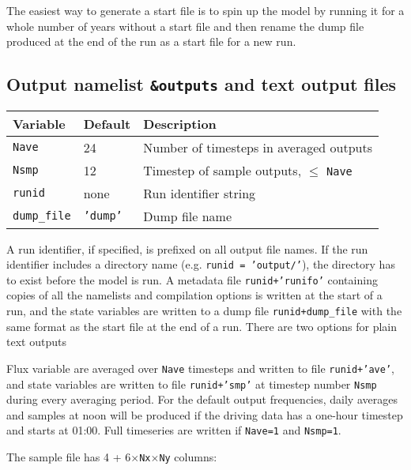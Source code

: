 \documentclass{article}
\begin{document}
The easiest way to generate a start file is to spin up the model by running it for a whole number of years without a start file and then rename the dump file produced at the end of the run as a start file for a new run.

\subsection{Output namelist {\tt \&outputs} and text output files}

\begin{longtable}{|l|l|l|}
\hline
Variable & Default & Description \\
\hline
{\tt Nave}       & 24           & Number of timesteps in averaged outputs       \\
{\tt Nsmp}       & 12           & Timestep of sample outputs, $\leq$ {\tt Nave} \\
{\tt runid}      & none         & Run identifier string                         \\
{\tt dump\_file} & {\tt 'dump'} & Dump file name                                \\
\hline 
\end{longtable}

A run identifier, if specified, is prefixed on all output file names. If the run identifier includes a directory name (e.g. {\tt runid = 'output/'}), the directory has to exist before the model is run. A metadata file {\tt runid+'runifo'} containing copies of all the namelists and compilation options is written at the start of a run, and the state variables are written to a dump file {\tt runid+dump\_file} with the same format as the start file at the end of a run. There are two options for plain text outputs

Flux variable are averaged over {\tt Nave} timesteps and written to file {\tt runid+'ave'}, and state variables are written to file {\tt runid+'smp'} at timestep number {\tt Nsmp} during every averaging period. For the default output frequencies, daily averages and samples at noon will be produced if the driving data has a one-hour timestep and starts at 01:00. Full timeseries are written if {\tt Nave=1} and {\tt Nsmp=1}. 

The sample file has 4 + 6$\times${\tt Nx$\times$Ny} columns:
\end{document}
